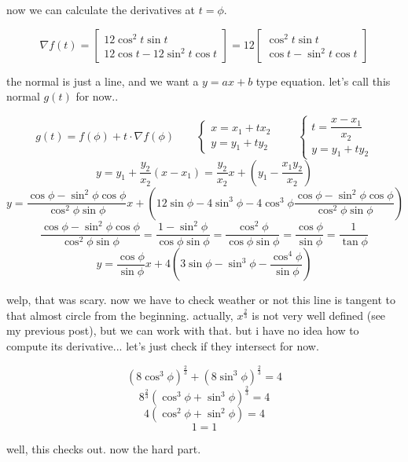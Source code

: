 \documentclass{article}
\begin{document}
  now we can calculate the derivatives at $t = \phi$.

  \[
    \nabla f(t) = \begin{bmatrix}
      12\cos^2t \sin t \\
      12\cos t - 12\sin^2t\cos t
    \end{bmatrix} = 12\begin{bmatrix}
      \cos^2t \sin t \\
      \cos t - \sin^2t\cos t
    \end{bmatrix}
  \]

  the normal is just a line, and we want a $y=ax+b$ type equation. let's call this normal $g(t)$ for now..

  \[
    g(t) = f(\phi) + t \cdot \nabla f(\phi) \qquad
    \begin{cases}
      x = x_1 + t x_2 \\
      y = y_1 + t y_2
    \end{cases} \qquad
    \begin{cases}
      t = \dfrac{x - x_1}{x_2} \\
      y = y_1 + t y_2
    \end{cases}
  \]
  \[
    y = y_1 + \frac{y_2}{x_2} (x - x_1) = \frac{y_2}{x_2} x + \left(y_1 - \frac{x_1y_2}{x_2}\right)
  \]
  \[
    y = \frac{\cos \phi - \sin^2\phi\cos \phi}{\cos^2\phi \sin \phi} x + \left(12 \sin \phi - 4 \sin^3 \phi - 4\cos^3\phi\frac{\cos \phi - \sin^2\phi\cos \phi}{\cos^2\phi \sin \phi}\right)
  \]
  \[
    \frac{\cos \phi - \sin^2\phi\cos \phi}{\cos^2\phi \sin \phi} =
    \frac{1 - \sin^2\phi}{\cos\phi \sin \phi} =
    \frac{\cos^2\phi}{\cos\phi \sin \phi} =
    \frac{\cos\phi}{\sin \phi} = \frac{1}{\tan\phi}
  \]
  \[
    y = \frac{\cos\phi}{\sin \phi} x + 4\left(3 \sin \phi - \sin^3 \phi -\frac{\cos^4\phi}{\sin \phi}\right)
  \]

  welp, that was scary. now we have to check weather or not this line is tangent to that almost circle from the beginning.
  actually, $x^\frac{2}{3}$ is not very well defined (see my previous post), but we can work with that.
  but i have no idea how to compute its derivative...
  let's just check if they intersect for now.

  \[
    (8 \cos^3 \phi)^\frac{2}{3} + (8 \sin^3 \phi)^\frac{2}{3} = 4
  \]
  \[
    8^\frac{2}{3} (\cos^3 \phi + \sin^3 \phi)^\frac{2}{3} = 4
  \]
  \[
    4 (\cos^2 \phi + \sin^2 \phi) = 4
  \]
  \[
    1 = 1
  \]

  well, this checks out. now the hard part.
\end{document}
